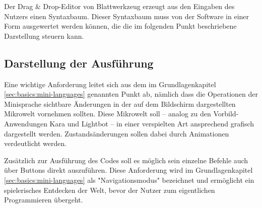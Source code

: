 Der Drag \& Drop-Editor von Blattwerkzeug  erzeugt aus den Eingaben des Nutzers einen Syntaxbaum. Dieser Syntaxbaum muss von der Software in einer Form ausgewertet werden können, die die im folgenden Punkt beschriebene Darstellung steuern kann.

\subsection{Darstellung der Ausführung}
\label{sec:requirements:world:display}

Eine wichtige Anforderung leitet sich aus dem im Grundlagenkapitel \ref{sec:basics:mini-languages} genannten Punkt ab, nämlich dass die Operationen der Minisprache sichtbare Änderungen in der auf dem Bildschirm dargestellten Mikrowelt vornehmen sollten. Diese Mikrowelt soll -- analog zu den Vorbild-Anwendungen Kara und Lightbot -- in einer verspielten Art ansprechend grafisch dargestellt werden. Zustandsänderungen sollen dabei durch Animationen verdeutlicht werden.

Zusätzlich zur Ausführung des Codes soll es möglich sein einzelne Befehle auch über Buttons direkt auszuführen. Diese Anforderung wird im Grundlagenkapitel \ref{sec:basics:mini-languages} als "Navigationsmodus" bezeichnet und ermöglicht ein spielerisches Entdecken der Welt, bevor der Nutzer zum eigentlichen Programmieren übergeht.
